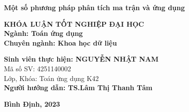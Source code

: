 \documentclass[12pt,a4paper,oneside]{report}
\numberwithin{equation}{section}
\begin{document}
\vskip 3cm
\begin{center}
{\bf\fontsize{22pt}{22}\selectfont Một số phương pháp phân tích ma trận và ứng dụng}



\vskip 3.5cm
{\bf\fontsize{16pt}{22}\selectfont KHÓA LUẬN TỐT NGHIỆP ĐẠI HỌC}\\
\vskip 0.5cm
{\bf\fontsize{16pt}{22}\selectfont Ngành: Toán ứng dụng}\\
\vskip 0.05cm
{\bf\fontsize{16pt}{22}\selectfont Chuyên ngành: Khoa học dữ liệu}\\
\vskip 2.5cm
\end{center}
\begin{flushleft}
{\bf\fontsize{16pt}{22}\selectfont Sinh viên thực hiện:  NGUYỄN NHẬT NAM}\\
\vskip 0.05cm
{\fontsize{16pt}{22}\selectfont Mã số SV: 4251140002}\\
\vskip 0.05cm
{\fontsize{16pt}{22}\selectfont Lớp, Khóa: Toán ứng dụng K42}\\
\vskip 2cm
{\bf\fontsize{16pt}{22}\selectfont Người hướng dẫn: TS.Lâm Thị Thanh Tâm}\\
\end{flushleft}


\vfill
\begin{center}
	{\bf\fontsize{14pt}{16pt}\selectfont Bình Định, 2023}
\end{center}
%
%	
%
%
\end{document}
